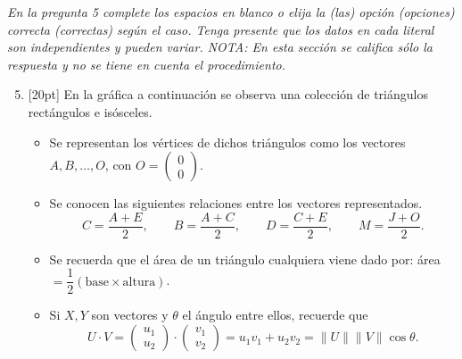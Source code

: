 \documentclass[11pt]{article}
\newcommand{\vect}[2]{\begin{pmatrix}#1\\#2\end{pmatrix}}
\newcommand{\nota}[1]{{\small\itshape\color{unalblue!70!black} #1}}
\begin{document}
\vspace{6pt}
\nota{En la pregunta 5 complete los espacios en blanco o elija la (las) opción (opciones) correcta (correctas) según el caso. Tenga presente que los datos en cada literal son independientes y pueden variar. NOTA: En esta sección se califica sólo la respuesta y no se tiene en cuenta el procedimiento.}

\begin{enumerate}
\setcounter{enumi}{4}
\item{}[20pt] En la gráfica a continuación se observa una colección de triángulos rectángulos e isósceles.
\begin{itemize}
\item Se representan los vértices de dichos triángulos como los vectores $A,B,\ldots,O$, con $O=\vect{0}{0}$.
\item Se conocen las siguientes relaciones entre los vectores representados.
$$C=\frac{A+E}{2},\qquad B=\frac{A+C}{2},\qquad D=\frac{C+E}{2},\qquad M=\frac{J+O}{2}.$$
\item Se recuerda que el área de un triángulo cualquiera viene dado por: área $=\dfrac{1}{2}(\text{base}\times\text{altura})$.
\item Si $X,Y$ son vectores y $\theta$ el ángulo entre ellos, recuerde que
$$U\cdot V=\vect{u_1}{u_2}\cdot\vect{v_1}{v_2}=u_1v_1+u_2v_2=\|U\|\|V\|\cos\theta.$$
\end{itemize}

\begin{center}
\end{center}


\end{enumerate}
\end{document}

